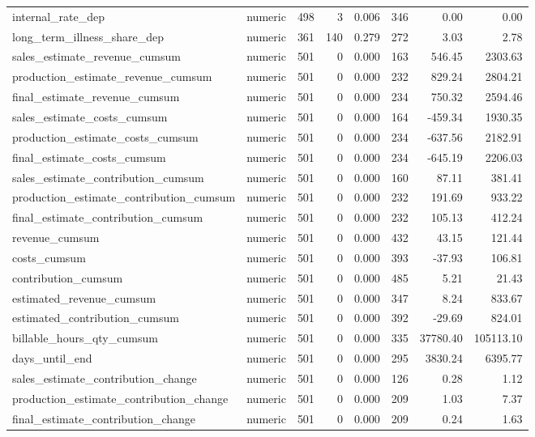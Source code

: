 \begin{landscape}
\begin{longtable}[t]{llrrrrrr}
internal\_rate\_dep & numeric & 498 & 3 & 0.006 & 346 & 0.00 & 0.00\\
long\_term\_illness\_share\_dep & numeric & 361 & 140 & 0.279 & 272 & 3.03 & 2.78\\
sales\_estimate\_revenue\_cumsum & numeric & 501 & 0 & 0.000 & 163 & 546.45 & 2303.63\\
production\_estimate\_revenue\_cumsum & numeric & 501 & 0 & 0.000 & 232 & 829.24 & 2804.21\\
final\_estimate\_revenue\_cumsum & numeric & 501 & 0 & 0.000 & 234 & 750.32 & 2594.46\\
sales\_estimate\_costs\_cumsum & numeric & 501 & 0 & 0.000 & 164 & -459.34 & 1930.35\\
production\_estimate\_costs\_cumsum & numeric & 501 & 0 & 0.000 & 234 & -637.56 & 2182.91\\
final\_estimate\_costs\_cumsum & numeric & 501 & 0 & 0.000 & 234 & -645.19 & 2206.03\\
sales\_estimate\_contribution\_cumsum & numeric & 501 & 0 & 0.000 & 160 & 87.11 & 381.41\\
production\_estimate\_contribution\_cumsum & numeric & 501 & 0 & 0.000 & 232 & 191.69 & 933.22\\
final\_estimate\_contribution\_cumsum & numeric & 501 & 0 & 0.000 & 232 & 105.13 & 412.24\\
revenue\_cumsum & numeric & 501 & 0 & 0.000 & 432 & 43.15 & 121.44\\
costs\_cumsum & numeric & 501 & 0 & 0.000 & 393 & -37.93 & 106.81\\
contribution\_cumsum & numeric & 501 & 0 & 0.000 & 485 & 5.21 & 21.43\\
estimated\_revenue\_cumsum & numeric & 501 & 0 & 0.000 & 347 & 8.24 & 833.67\\
estimated\_contribution\_cumsum & numeric & 501 & 0 & 0.000 & 392 & -29.69 & 824.01\\
billable\_hours\_qty\_cumsum & numeric & 501 & 0 & 0.000 & 335 & 37780.40 & 105113.10\\
days\_until\_end & numeric & 501 & 0 & 0.000 & 295 & 3830.24 & 6395.77\\
sales\_estimate\_contribution\_change & numeric & 501 & 0 & 0.000 & 126 & 0.28 & 1.12\\
production\_estimate\_contribution\_change & numeric & 501 & 0 & 0.000 & 209 & 1.03 & 7.37\\
final\_estimate\_contribution\_change & numeric & 501 & 0 & 0.000 & 209 & 0.24 & 1.63\\

\end{longtable}
\end{landscape}

